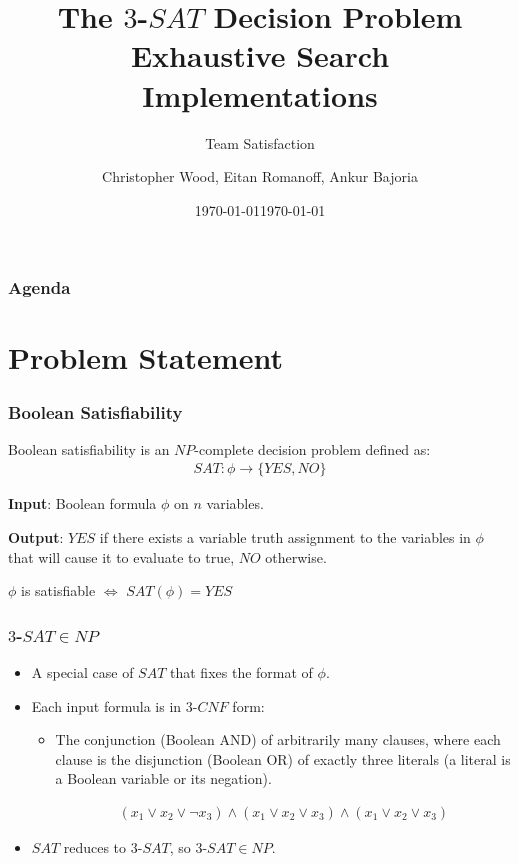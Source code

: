 \documentclass[handout]{beamer}
\title[Team Satisfaction - $3$-$SAT$]{The $3$-$SAT$ Decision Problem \\ Exhaustive Search Implementations}
\institute[RIT]{}
\date{\today}
\subtitle{Team Satisfaction}
\author{Christopher Wood, Eitan Romanoff, Ankur Bajoria}
\date{\today}
\begin{document}
\begin{frame}
	\titlepage
\end{frame}

\begin{frame}
	\frametitle{Agenda}
	\tableofcontents
\end{frame}

\section{Problem Statement}
\begin{frame}
	\frametitle{Boolean Satisfiability}

	Boolean satisfiability is an $NP$-complete decision problem defined as:
	\begin{align*}
	SAT : \phi \to \{YES, NO\}
	\end{align*}

	\medskip

	\textbf{Input}: Boolean formula $\phi$ on $n$ variables.

	\medskip 

	\textbf{Output}: $YES$ if there exists a variable truth assignment to the
	variables in $\phi$ that will cause it to evaluate to true, $NO$ otherwise.

	\medskip

	\begin{center}
		$\phi$ is satisfiable $\Leftrightarrow$ $SAT(\phi) = YES$
	\end{center}

\end{frame}


\begin{frame}
	\frametitle{$3$-$SAT \in NP$}
	\begin{itemize}
		\item A special case of $SAT$ that fixes the format of $\phi$.
		\item Each input formula is in $3$-$CNF$ form:
		\begin{itemize}
			\item The conjunction (Boolean AND) of arbitrarily many clauses, 
			where each clause is the disjunction (Boolean OR) of exactly three literals (a 
			literal is a Boolean variable or its negation).

			\begin{align*}
				(x_1 \lor x_2 \lor \lnot x_3) \land (x_1 \lor x_2 \lor x_3) \land (x_1 \lor x_2 \lor x_3)
			\end{align*}

		\end{itemize}
		\item $SAT$ reduces to $3$-$SAT$, so $3$-$SAT \in NP$.
	\end{itemize}
\end{frame}
\end{document}
